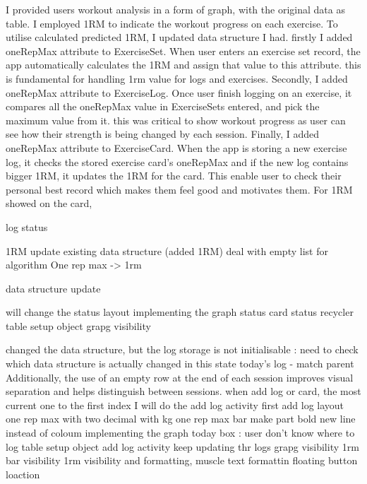 


I provided users workout analysis in a form of graph, with the original data as table.
I employed 1RM to indicate the workout progress on each exercise.
To utilise calculated predicted 1RM, I updated data structure I had.
firstly I added oneRepMax attribute to ExerciseSet.
When user enters an exercise set record, the app automatically calculates the 1RM and assign that value to this attribute.
this is fundamental for handling 1rm value for logs and exercises.
Secondly, I added oneRepMax attribute to ExerciseLog.
Once user finish logging on an exercise, it compares all the oneRepMax value in ExerciseSets entered, and pick the maximum value from it.
this was critical to show workout progress as user can see how their strength is being changed by each session.
Finally, I added oneRepMax attribute to ExerciseCard.
When the app is storing a new exercise log, it checks the stored exercise card's oneRepMax and if the new log contains bigger 1RM, it updates the 1RM for the card.
This enable user to check their personal best record which makes them feel good and motivates them.
For 1RM showed on the card, 

log 
status


\predicted 1RM
update existing data structure (added 1RM)
deal with empty list for algorithm
One rep max -> 1rm

data structure update


will change the status layout
implementing the graph
status card
status recycler
table setup object
grapg visibility


changed the data structure, but the log storage is not initialisable 
\todo : need to check which data structure is actually changed in this state
today's log - match parent
Additionally, the use of an empty row at the end of each session improves visual separation and helps distinguish between sessions.
when add log or card, the most current one to the first index
I will do the add log activity first
add log layout
one rep max with two decimal with kg
one rep max bar
make part bold
new line instead of coloum
implementing the graph
today box : user don't know where to log
table setup object
add log activity keep updating thr logs
grapg visibility
1rm bar visibility
1rm visibility and formatting, muscle text formattin
floating button loaction

